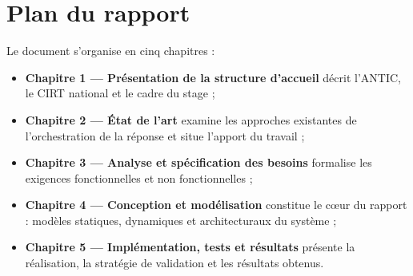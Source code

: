 \section*{Plan du rapport}
Le document s'organise en cinq chapitres :

\begin{itemize}
  \item \textbf{Chapitre 1 --- Pr\'esentation de la structure d'accueil} d\'ecrit
        l'ANTIC, le CIRT national et le cadre du stage ;
  \item \textbf{Chapitre 2 --- \'Etat de l'art} examine les approches existantes de
        l'orchestration de la r\'eponse et situe l'apport du travail ;
  \item \textbf{Chapitre 3 --- Analyse et sp\'ecification des besoins} formalise les
        exigences fonctionnelles et non fonctionnelles ;
  \item \textbf{Chapitre 4 --- Conception et mod\'elisation} constitue le c\oe ur du
        rapport : mod\`eles statiques, dynamiques et architecturaux du syst\`eme ;
  \item \textbf{Chapitre 5 --- Impl\'ementation, tests et r\'esultats} pr\'esente la
        r\'ealisation, la strat\'egie de validation et les r\'esultats obtenus.
\end{itemize}
